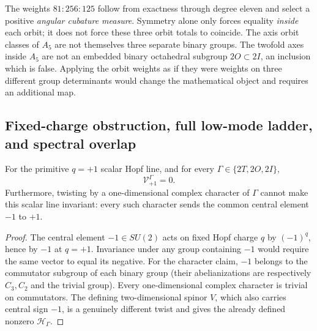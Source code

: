 \documentclass[11pt]{article}
\begin{document}
\begin{remark}
The weights $81:256:125$ follow from exactness through degree eleven
and select a positive \emph{angular cubature measure}.  Symmetry alone
only forces equality \emph{inside} each orbit; it does not force these
three orbit totals to coincide.  The axis orbit classes of $A_5$ are
not themselves three separate binary groups.  The twofold axes
inside $A_5$ are not an embedded binary octahedral subgroup
$2O\subset2I$, an inclusion which is false.  Applying the orbit
weights as if they were weights on three different group determinants
would change the mathematical object and requires an additional map.
\end{remark}

\subsection{Fixed-charge obstruction, full low-mode ladder, and spectral overlap}
\label{p1b:subsec:v11-spinorial-completion}

\begin{lemma}
\label{p1b:lem:v11-unit-charge-obstruction}
For the primitive $q=+1$ scalar Hopf line, and for every
$\Gamma\in\{2T,2O,2I\}$,
\[
 \mathcal V_{+1}^{\Gamma}=0.
\]
Furthermore, twisting by a one-dimensional complex character of
$\Gamma$ cannot make this scalar line invariant: every such character
sends the common central element $-1$ to $+1$.
\end{lemma}
\begin{proof}
The central element $-1\in SU(2)$ acts on fixed Hopf charge $q$
by $(-1)^q$, hence by $-1$ at $q=+1$.  Invariance under any group
containing $-1$ would require the same vector to equal its negative.
For the character claim, $-1$ belongs to the commutator subgroup of
each binary group (their abelianizations are respectively $C_3,C_2$
and the trivial group).  Every one-dimensional complex character is
trivial on commutators.  The defining two-dimensional spinor $V$,
which also carries central sign $-1$, is a genuinely different twist
and gives the already defined nonzero $\mathscr H_\Gamma$.
\end{proof}
\end{document}
